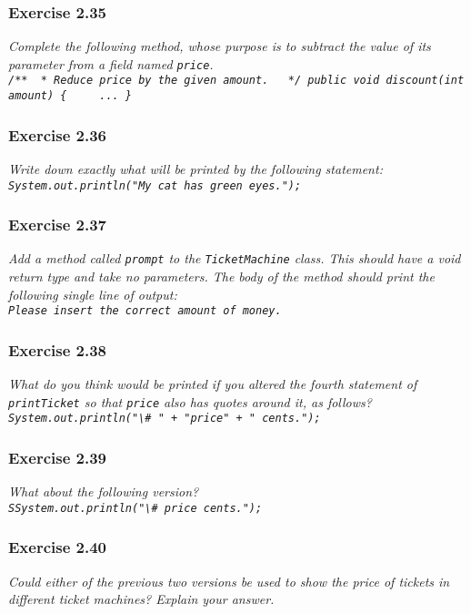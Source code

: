 \subsubsection*{Exercise 2.35}
\textit{Complete the following method, whose purpose is to subtract the value 
of its parameter from a field named \lstinline?price?. \\
\lstinline?/**
 * Reduce price by the given amount. 
 */
public void discount(int amount)
{
    ...
}?}\\

\subsubsection*{Exercise 2.36}
\textit{Write down exactly what will be printed by the following statement: \\
\lstinline?System.out.println("My cat has green eyes.");?}\\

\subsubsection*{Exercise 2.37}
\textit{Add a method called \lstinline?prompt? to the \lstinline?TicketMachine? 
class. This should have a void return type and take no parameters. The body of 
the method should print the following single line of output: \\
\lstinline?Please insert the correct amount of money. ?}\\

\subsubsection*{Exercise 2.38}
\textit{What do you think would be printed if you altered the fourth statement 
of \lstinline?printTicket? so that \lstinline?price? also has quotes around it, 
as follows? \\
\lstinline?System.out.println("\# " + "price" + " cents.");?}\\

\subsubsection*{Exercise 2.39}
\textit{What about the following version? \\
\lstinline?SSystem.out.println("\# price cents.");?}\\

\subsubsection*{Exercise 2.40}
\textit{Could either of the previous two versions be used to show the price of 
tickets in different ticket machines? Explain your answer. }\\

